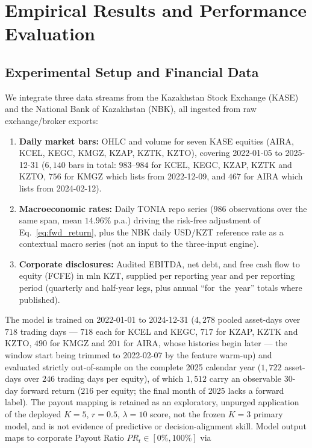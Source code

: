 \documentclass[pdflatex,sn-mathphys-num]{sn-jnl}
\theoremstyle{thmstyleone}
\theoremstyle{thmstyletwo}
\theoremstyle{thmstylethree}
\begin{document}
\section{Empirical Results and Performance Evaluation}\label{sec4}

\subsection{Experimental Setup and Financial Data}\label{subsec4_1}

We integrate three data streams from the Kazakhstan Stock Exchange (KASE) and the National Bank of Kazakhstan (NBK), all ingested from raw exchange/broker exports:
\begin{enumerate}
    \item \textbf{Daily market bars:} OHLC and volume for seven KASE equities (AIRA, KCEL, KEGC, KMGZ, KZAP, KZTK, KZTO), covering 2022-01-05 to 2025-12-31 ($6{,}140$ bars in total: $983$--$984$ for KCEL, KEGC, KZAP, KZTK and KZTO, $756$ for KMGZ which lists from 2022-12-09, and $467$ for AIRA which lists from 2024-02-12).
    \item \textbf{Macroeconomic rates:} Daily TONIA repo series ($986$ observations over the same span, mean $14.96\%$ p.a.) driving the risk-free adjustment of Eq.~\eqref{eq:fwd_return}, plus the NBK daily USD/KZT reference rate as a contextual macro series (not an input to the three-input engine).
    \item \textbf{Corporate disclosures:} Audited EBITDA, net debt, and free cash flow to equity (FCFE) in mln KZT, supplied per reporting year and per reporting period (quarterly and half-year legs, plus annual \mbox{``for the year''} totals where published).
\end{enumerate}

The model is trained on 2022-01-01 to 2024-12-31 ($4{,}278$ pooled asset-days over $718$ trading days --- $718$ each for KCEL and KEGC, $717$ for KZAP, KZTK and KZTO, $490$ for KMGZ and $201$ for AIRA, whose histories begin later --- the window start being trimmed to 2022-02-07 by the feature warm-up) and evaluated strictly out-of-sample on the complete 2025 calendar year ($1{,}722$ asset-days over $246$ trading days per equity), of which $1{,}512$ carry an observable 30-day forward return ($216$ per equity; the final month of 2025 lacks a forward label). The payout mapping is retained as an exploratory, unpurged application of the deployed $K=5$, $r=0.5$, $\lambda=10$ score, not the frozen $K=3$ primary model, and is not evidence of predictive or decision-alignment skill. Model output maps to corporate Payout Ratio $PR_t \in [0\%, 100\%]$ via
\end{document}
